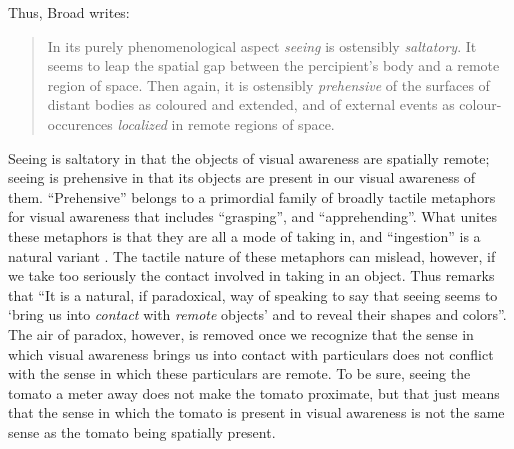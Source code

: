 \documentclass[12pt]{article}
\begin{document}
Thus, Broad writes:
\begin{quote}
    In its purely phenomenological aspect \emph{seeing} is ostensibly \emph{saltatory}. It seems to leap the spatial gap between the percipient's body and a remote region of space. Then again, it is ostensibly \emph{prehensive} of the surfaces of distant bodies as coloured and extended, and of external events as colour-occurences \emph{localized} in remote regions of space. \citep[32]{Broad:1965dq}
\end{quote}
Seeing is saltatory in that the objects of visual awareness are spatially remote; seeing is prehensive in that its objects are present in our visual awareness of them. ``Prehensive'' belongs to a primordial family of broadly tactile metaphors for visual awareness that includes ``grasping'', and ``apprehending''. What unites these metaphors is that they are all a mode of taking in, and ``ingestion'' is a natural variant \citep[see][7]{Johnston:2006uq,Price:1932fk}. The tactile nature of these metaphors can mislead, however, if we take too seriously the contact involved in taking in an object. Thus \citet[33]{Broad:1965dq} remarks that ``It is a natural, if paradoxical, way of speaking to say that seeing seems to `bring us into \emph{contact} with \emph{remote} objects' and to reveal their shapes and colors''. The air of paradox, however, is removed once we recognize that the sense in which visual awareness brings us into contact with particulars does not conflict with the sense in which these particulars are remote. To be sure, seeing the tomato a meter away does not make the tomato proximate, but that just means that the sense in which the tomato is present in visual awareness is not the same sense as the tomato being spatially present.
\end{document}
